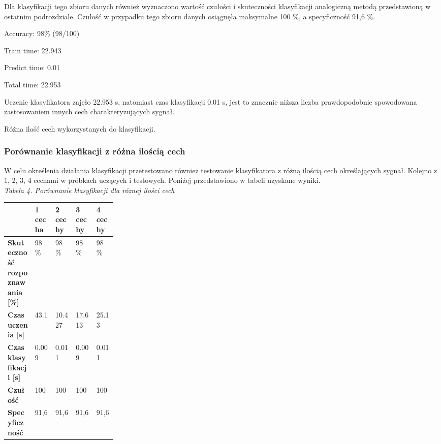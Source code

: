 \documentclass[11pt]{article}
\begin{document}
\begin{enumerate}
\noindent Dla klasyfikacji tego zbioru danych również wyznaczono wartość czułości i skuteczności klasyfikacji analogiczną metodą przedstawioną w ostatnim podrozdziale. Czułość w przypadku tego zbioru danych osiągnęła maksymalne 100 \%, a specyficzność 91,6 \%.

\noindent Accuracy: 98\% (98/100)

\noindent Train time:     22.943

\noindent Predict time:   0.01

\noindent Total time:     22.953

\noindent Uczenie klasyfikatora zajęło 22.953 s, natomiast czas klasyfikacji 0.01 s, jest to znacznie niższa liczba prawdopodobnie spowodowana zastosowaniem innych cech charakteryzujących sygnał. 

\noindent Różna ilość cech wykorzystanych do klasyfikacji.

\noindent 

\noindent 

\subsubsection{Porównanie klasyfikacji z różna ilością cech} 
\noindent W celu określenia działania klasyfikacji przetestowano również testowanie klasyfikatora z różną ilością cech określających sygnał. Kolejno z 1, 2, 3, 4 cechami w próbkach uczących i testowych. Poniżej przedstawiono w tabeli uzyskane wyniki.\\
\textit{ Tabela 4. Porównanie klasyfikacji dla róznej ilości cech}
\newline
\begin{tabular}{|p{0.25\linewidth}|p{0.8in}|p{0.8in}|p{0.8in}|p{0.8in}|} \hline 
 & \textbf{1 cecha} & \textbf{2 cechy} & \textbf{3 cechy} & \textbf{4 cechy} \\ \hline 
\textbf{Skuteczność rozpoznawania [\%]} & 98 \% & 98 \% & 98 \% & 98 \% \\ \hline 
\textbf{Czas uczenia [s]} & 43.1 & 10.427 & 17.613 & 25.13 \\ \hline 
\textbf{Czas klasyfikacji [s]} & 0.009 & 0.011 & 0.009 & 0.011 \\ \hline 
\textbf{Czułość} & 100 & 100 & 100 & 100 \\ \hline 
\textbf{Specyficzność} & 91,6 & 91,6 & 91,6 & 91,6 \\ \hline 
\end{tabular}\\




\end{enumerate}
\end{document}
